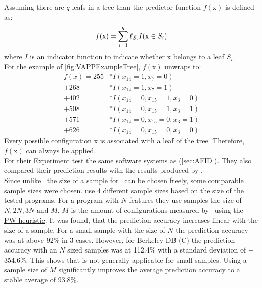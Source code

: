 Assuming there are $q$ leafs in a tree than the predictor function $f(\mathrm{x})$ is defined as:
\begin{equation}\textsl{}
f(\mathrm{x})=\sum_{i=1}^{q} \ell_{S_i}I(\mathrm{x}\in S_i)
\end{equation}
where $I$ is an indicator function to indicate whether $\mathrm{x}$ belongs to a leaf $S_i$.\\
For the example of \cref{fig:VAPPExampleTree}, $f(\mathrm{x})$ unwraps to:
\begin{align*}
f(x) = 255&* I(x_{14}=1,x_7=0)\\[-0.1cm]
	 + 268&* I(x_{14}=1,x_7=1)\\[-0.1cm]
	 + 402&* I(x_{14}=0,x_{15}=1,x_3=0)\\[-0.1cm]
	 + 508&* I(x_{14}=0,x_{15}=1,x_3=1)\\[-0.1cm]
	 + 571&* I(x_{14}=0,x_{15}=0,x_3=1)\\[-0.1cm]
	 + 626&* I(x_{14}=0,x_{15}=0,x_3=0)
\end{align*}
Every possible configuration $\mathrm{x}$ is associated with a leaf of the tree. Therefore, $f(\mathrm{x})$ can always be applied.\\

For their Experiment \citet{VariabilityAwarePerformancePredictionJianmeiSigmundApel} test the same software systems as \citet{AutomatedFeatureDetectionSiegmund2012} (\cref{sec:AFID}). They also compared their prediction results with the results produced by \AFID.\\
Since unlike \AFID~the size of a sample for \VAPP~can be chosen freely, some comparable sample sizes were chosen. \citet{VariabilityAwarePerformancePredictionJianmeiSigmundApel} use 4 different sample sizes based on the size of the tested programs. For a program with $N$ features they use samples the size of $N,2N,3N \text{ and } M$. $M$ is the amount of configurations measured by \AFID~using the \hyperref[lab:PW]{PW-heuristic}.
It was found, that the prediction accuracy increases linear with the size of a sample. For a small sample with the size of $N$ the prediction accuracy was at above 92\% in 3 cases. However, for Berkeley DB (C) the prediction accuracy with an $N$ sized samples was at 112.4\% with a standard deviation of $\pm$354.6\%. This shows that \VAPP is not generally applicable for small samples.
Using a sample size of $M$ significantly improves the average prediction accuracy to a stable average of 93.8\%.\\
